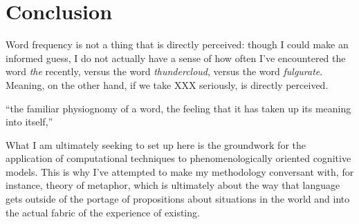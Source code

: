 \chapter{Conclusion}

Word frequency is not a thing that is directly perceived: though I could make an informed guess, I do not actually have a sense of how often I've encountered the word \emph{the} recently, versus the word \emph{thundercloud}, versus the word \emph{fulgurate}.  Meaning, on the other hand, if we take XXX seriously, is directly perceived.

``the familiar physiognomy of a word, the feeling that it has taken up its meaning into itself,'' \citep[][p. 218]{Wittgenstein}

What I am ultimately seeking to set up here is the groundwork for the application of computational techniques to phenomenologically oriented cognitive models.  This is why I've attempted to make my methodology conversant with, for instance, \cite{Davidson1978} theory of metaphor, which is ultimately about the way that language gets outside of the portage of propositions about situations in the world and into the actual fabric of the experience of existing.

